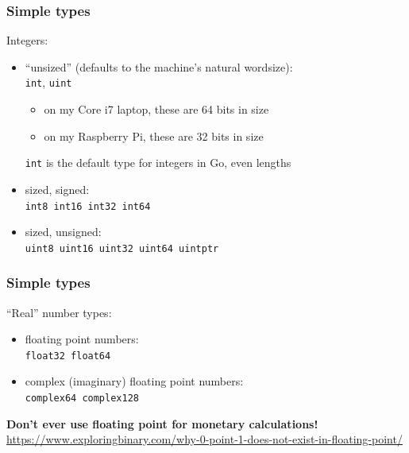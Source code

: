 \documentclass[handout,compress,t,11pt]{beamer}
\begin{document}
\begin{frame}[fragile]
    \frametitle{Simple types}
    Integers:
    \begin{itemize}
        \item ``unsized'' (defaults to the machine's natural wordsize): \\
        \verb|int|, \verb|uint| \\
        \vspace{0.5\baselineskip}
        \begin{itemize}
        \item on my Core i7 laptop, these are 64 bits in size
        \item on my Raspberry Pi, these are 32 bits in size
        \end{itemize}
        \vspace{0.5\baselineskip}
        \verb|int| is the default type for integers in Go, even lengths
        \vspace{\baselineskip}
        \item sized, signed: \\
        \verb|int8 int16 int32 int64|
        \vspace{\baselineskip}
        \item sized, unsigned: \\
        \verb|uint8 uint16 uint32 uint64 uintptr|
    \end{itemize}
\end{frame}

\begin{frame}[fragile]
    \frametitle{Simple types}
    ``Real'' number types:
    \begin{itemize}
        \item floating point numbers: \\
        \verb|float32 float64|
        \vspace{\baselineskip}
        \item complex (imaginary) floating point numbers: \\
        \verb|complex64 complex128|
    \end{itemize}
    \vspace{4\baselineskip}
    \alert{{\bf Don't ever use floating point for monetary calculations!}}
    \vspace{0.5\baselineskip}
    {\scriptsize \href{https://www.exploringbinary.com/why-0-point-1-does-not-exist-in-floating-point/}%
    {https://www.exploringbinary.com/why-0-point-1-does-not-exist-in-floating-point/}}
\end{frame}
\end{document}
